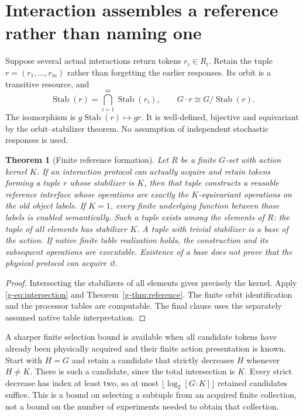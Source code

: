 \documentclass[11pt]{article}
\newtheorem{theorem}{Theorem}[section]
\theoremstyle{definition}
\theoremstyle{remark}
\newcommand{\Stab}{\operatorname{Stab}}
\begin{document}
\section{Interaction assembles a reference rather than naming one}
Suppose several actual interactions return tokens $r_i\in R_i$. Retain the tuple $r=(r_1,\ldots,r_m)$ rather than forgetting the earlier responses. Its orbit is a transitive resource, and
\begin{equation}\label{g-eq:intersection}
 \Stab(r)=\bigcap_{i=1}^m\Stab(r_i),
 \qquad G\cdot r\cong G/\Stab(r).
\end{equation}
The isomorphism is $g\Stab(r)\mapsto gr$. It is well-defined, bijective and equivariant by the orbit--stabilizer theorem. No assumption of independent stochastic responses is used.

\begin{theorem}[Finite reference formation]\label{g-thm:formation}
Let $R$ be a finite $G$-set with action kernel $K$. If an interaction protocol can actually acquire and retain tokens forming a tuple $r$ whose stabilizer is $K$, then that tuple constructs a reusable reference interface whose operations are exactly the $K$-equivariant operations on the old object labels. If $K=1$, every finite underlying function between those labels is enabled semantically. Such a tuple exists among the elements of $R$: the tuple of all elements has stabilizer $K$. A tuple with trivial stabilizer is a base of the action. If native finite table realization holds, the construction and its subsequent operations are executable. Existence of a base does not prove that the physical protocol can acquire it.
\end{theorem}
\begin{proof}
Intersecting the stabilizers of all elements gives precisely the kernel. Apply \eqref{g-eq:intersection} and Theorem~\ref{g-thm:reference}. The finite orbit identification and the processor tables are computable. The final clause uses the separately assumed native table interpretation.\end{proof}

A sharper finite selection bound is available when all candidate tokens have already been physically acquired and their finite action presentation is known. Start with $H=G$ and retain a candidate that strictly decreases $H$ whenever $H\ne K$. There is such a candidate, since the total intersection is $K$. Every strict decrease has index at least two, so at most $\lfloor\log_2[G:K]\rfloor$ retained candidates suffice. This is a bound on selecting a subtuple from an acquired finite collection, not a bound on the number of experiments needed to obtain that collection.
\end{document}
